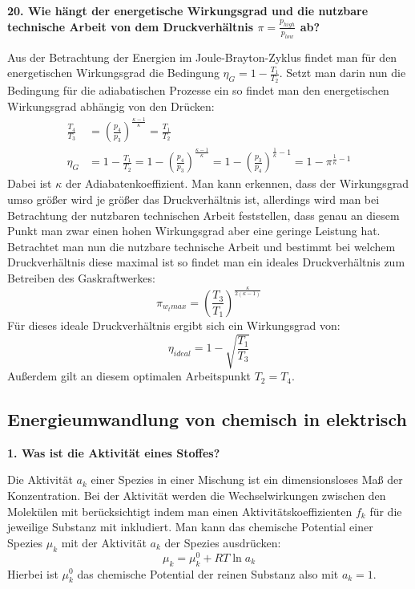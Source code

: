 \noindent \textbf{20. Wie hängt der energetische Wirkungsgrad und die nutzbare technische Arbeit von dem Druckverhältnis $\pi = \frac{p_{high}}{p_{low}}$ ab?}\\
\begin{addmargin}[25pt]{0pt}
Aus der Betrachtung der Energien im Joule-Brayton-Zyklus findet man für den energetischen Wirkungsgrad die Bedingung $\eta_{G} = 1 -\frac{T_1}{T_2}$. Setzt man darin nun die Bedingung für die adiabatischen Prozesse ein so findet man den energetischen Wirkungsgrad abhängig von den Drücken: 
\begin{align}
    \frac{T_4}{T_3} &= \left( \frac{p_4}{p_3}\right)^\frac{\kappa -1}{\kappa}= \frac{T_1}{T_2}\\
    \eta_G &= 1 - \frac{T_1}{T_2} = 1 - \left( \frac{p_4}{p_3}\right)^\frac{\kappa -1}{\kappa} = 1- \left( \frac{p_3}{p_4}\right)^{\frac{1}{\kappa} - 1} = 1- \pi^{\frac{1}{\kappa} - 1} 
\end{align}
Dabei ist $\kappa$ der Adiabatenkoeffizient. Man kann erkennen, dass der Wirkungsgrad umso größer wird je größer das Druckverhältnis ist, allerdings wird man bei Betrachtung der nutzbaren technischen Arbeit feststellen, dass genau an diesem Punkt man zwar einen hohen Wirkungsgrad aber eine geringe Leistung hat. Betrachtet man nun die nutzbare technische Arbeit und bestimmt bei welchem Druckverhältnis diese maximal ist so findet man ein ideales Druckverhältnis zum Betreiben des Gaskraftwerkes:
\begin{equation}\label{eq:ideales_Druckverhältnis_Gaskraftwerk}
    \pi_{w_tmax} = \left( \frac{T_3}{T_1}\right)^\frac{\kappa}{2(\kappa - 1)}
\end{equation}
Für dieses ideale Druckverhältnis ergibt sich ein Wirkungsgrad von:
\begin{equation}\label{eq:idealer_Wirkungsgrad_Gaskraftwerk}
\eta_{ideal} = 1 - \sqrt{\frac{T_1}{T_3}}    
\end{equation}
Außerdem gilt an diesem optimalen Arbeitspunkt $T_2 = T_4$.\\
\end{addmargin}

\subsection{Energieumwandlung von chemisch in elektrisch}
\noindent \textbf{1. Was ist die Aktivität eines Stoffes?}\\
\begin{addmargin}[25pt]{0pt}
Die Aktivität $a_k$ einer Spezies in einer Mischung ist ein dimensionsloses Maß der Konzentration. Bei der Aktivität werden die Wechselwirkungen zwischen den Molekülen mit berücksichtigt indem man einen Aktivitätskoeffizienten $f_k$ für die jeweilige Substanz mit inkludiert. Man kann das chemische Potential einer Spezies $\mu_k$ mit der Aktivität $a_k$ der Spezies ausdrücken:
\begin{equation}\label{eq:chemisches_Potential_Aktivität}
    \mu_k = \mu_k^0 + RT \ln a_k
\end{equation}
Hierbei ist $\mu_k^0$ das chemische Potential der reinen Substanz also mit $a_k = 1$.\\
\end{addmargin}

